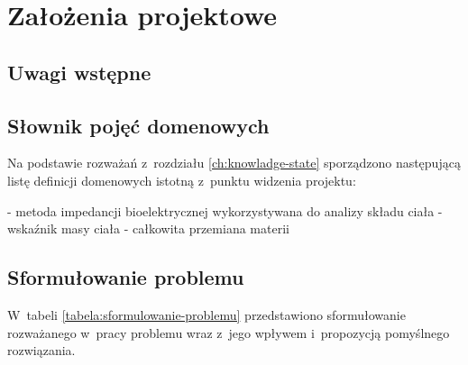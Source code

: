 \chapter{Założenia projektowe}\label{ch:design-assumptions}
\section{Uwagi wstępne}\label{sec:presumptions}

\lipsum[5]

\section{Słownik pojęć domenowych}\label{sec:dictionary}

Na podstawie rozważań z~rozdziału \ref{ch:knowladge-state} sporządzono następującą listę definicji domenowych istotną z~punktu widzenia projektu:
\begin{itemize}[series=atr, wide, align=left, leftmargin=190pt]
    - metoda impedancji bioelektrycznej wykorzystywana do analizy składu ciała
    - wskaźnik masy ciała
    - całkowita przemiana materii
\end{itemize}

\section{Sformułowanie problemu}\label{sec:problem-specification}

\par
W~tabeli \ref{tabela:sformulowanie-problemu} przedstawiono sformułowanie rozważanego w~pracy problemu wraz z~jego wpływem i~propozycją pomyślnego rozwiązania.

